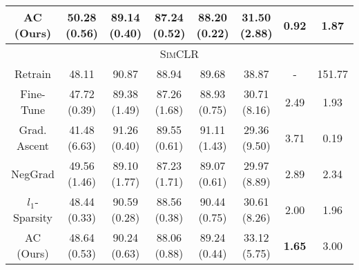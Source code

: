 \documentclass{article}
\begin{document}
\begin{table}[htb]
{\begin{tabular}{c|cccccc|c}
AC (Ours)         & 50.28 (0.56) & 89.14 (0.40) & 87.24 (0.52) & 88.20 (0.22)  & 31.50 (2.88) & \textbf{0.92}     &1.87     \\
\hline
\multicolumn{8}{c}{\cellcolor[HTML]{EFEFEF}\textsc{SimCLR}}      \\
\hline
Retrain      & 48.11        & 90.87        & 88.94        & 89.68        & 38.87        & -         & 151.77    \\
Fine-Tune    & 47.72 (0.39) & 89.38 (1.49) & 87.26 (1.68) & 88.93 (0.75) & 30.71 (8.16) & 2.49     &  1.93   \\
Grad. Ascent & 41.48 (6.63) & 91.26 (0.40)  & 89.55 (0.61) & 91.11 (1.43) & 29.36 (9.50)  & 3.71     & 0.19    \\
NegGrad      & 49.56 (1.46) & 89.10 (1.77)  & 87.23 (1.71) & 89.07 (0.61) & 29.97 (8.89) & 2.89     &  2.34   \\
$l_1$-Sparsity  & 48.44 (0.33) & 90.59 (0.28) & 88.56 (0.38) & 90.44 (0.75) & 30.61 (8.26) & 2.00        &  1.96   \\
AC (Ours)         & 48.64 (0.53) & 90.24 (0.63) & 88.06 (0.88) & 89.24 (0.44) & 33.12 (5.75) & \textbf{1.65}     &  3.00\\
\bottomrule
\end{tabular}%
}
\end{table}




\begin{table}[ht]


\end{table}
\end{document}

